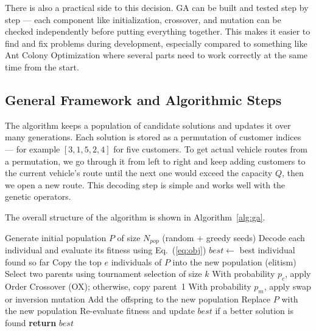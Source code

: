 \documentclass [a4paper, 11pt, titlepage] {article}
\begin{document}
There is also a practical side to this decision. GA can be built and tested step by step --- each component like initialization, crossover, and mutation can be checked independently before putting everything together. This makes it easier to find and fix problems during development, especially compared to something like Ant Colony Optimization where several parts need to work correctly at the same time from the start.

\subsection{General Framework and Algorithmic Steps}

The algorithm keeps a population of candidate solutions and updates it over many generations. Each solution is stored as a permutation of customer indices --- for example $[3, 1, 5, 2, 4]$ for five customers. To get actual vehicle routes from a permutation, we go through it from left to right and keep adding customers to the current vehicle's route until the next one would exceed the capacity $Q$, then we open a new route. This decoding step is simple and works well with the genetic operators.

The overall structure of the algorithm is shown in Algorithm~\ref{alg:ga}.

\begin{algorithm}[H]
\caption{Genetic Algorithm for GVRP}
\label{alg:ga}
\begin{algorithmic}[1]
    \State Generate initial population $P$ of size $N_{pop}$ (random + greedy seeds)
    \State Decode each individual and evaluate its fitness using Eq.~(\ref{eq:obj})
    \State $best \gets$ best individual found so far
        \State Copy the top $e$ individuals of $P$ into the new population (elitism)
            \State Select two parents using tournament selection of size $k$
            \State With probability $p_c$, apply Order Crossover (OX); otherwise, copy parent~1
            \State With probability $p_m$, apply swap or inversion mutation
            \State Add the offspring to the new population
        \EndWhile
        \State Replace $P$ with the new population
        \State Re-evaluate fitness and update $best$ if a better solution is found
    \EndWhile
    \State \textbf{return} $best$
\end{algorithmic}
\end{algorithm}
\end{document}
